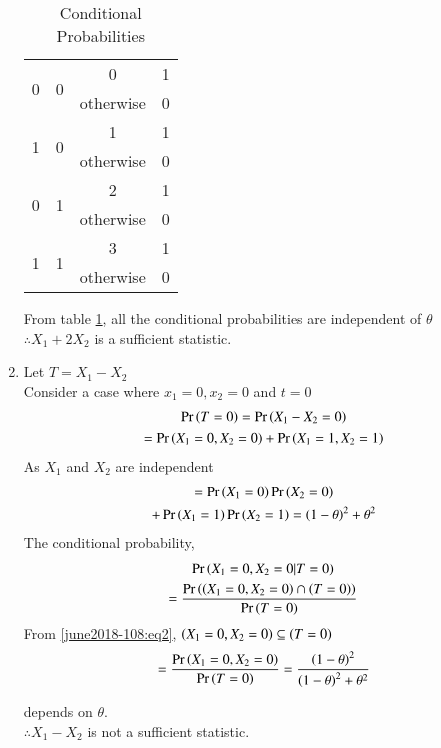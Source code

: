\begin{enumerate}
\begin{table}[h!]
\begin{tabular}[width=\columnwidth]{|c|c|c|c|}
        \hline
        \multirow{2}{*}{0} & \multirow{2}{*}{0} & 0 & 1\\ 
        & & otherwise & 0 \\ 
        \hline
        \multirow{2}{*}{1} & \multirow{2}{*}{0} & 1 & 1\\ 
        & & otherwise & 0 \\ 
        \hline
        \multirow{2}{*}{0} & \multirow{2}{*}{1} & 2 & 1\\ 
        & & otherwise & 0 \\ 
        \hline
        \multirow{2}{*}{1} & \multirow{2}{*}{1} & 3 & 1\\ 
        & & otherwise & 0 \\        
        \hline
    \end{tabular}
    \caption{Conditional Probabilities}
    \label{june2018-108:table1}
    \end{table}    
    
    From table \ref{june2018-108:table1}, all the conditional probabilities are independent of $\theta$\\ $\therefore X_1+2X_2$ is a sufficient statistic.
    
    
    \item Let $T=X_1-X_2$\\
    Consider a case where $x_1=0, x_2=0$ and $t=0$
    \begin{multline}
        \label{june2018-108:eq2}\Pr\left(T=0\right)=\Pr\left(X_1-X_2=0\right)\\=\Pr\left(X_1=0,X_2=0\right)+\Pr\left(X_1=1,X_2=1\right)
    \end{multline}
    As $X_1$ and $X_2$ are independent
    \begin{multline}
        =\Pr\left(X_1=0\right)\Pr\left(X_2=0\right)\\+\Pr\left(X_1=1\right)\Pr\left(X_2=1\right)=\left(1-\theta\right)^2 + \theta^2
    \end{multline}
    The conditional probability,
    \begin{multline}
        \Pr\left(X_1=0,X_2=0 | T=0\right)\\
        =\frac{\Pr\left(\left(X_1=0,X_2=0\right)\cap\left(T=0\right)\right)}{\Pr\left(T=0\right)}
    \end{multline}
    From \eqref{june2018-108:eq2}, $\left(X_1=0,X_2=0\right) \subseteq \left(T=0\right)$
    \begin{multline}
        =\frac{\Pr\left(X_1=0,X_2=0\right)}{\Pr\left(T=0\right)}=\frac{\left(1-\theta\right)^2}{\left(1-\theta\right)^2 + \theta^2}
    \end{multline}
  
    depends on $\theta$. \\
    $\therefore X_1-X_2$ is not a sufficient statistic.
    

\end{enumerate}
